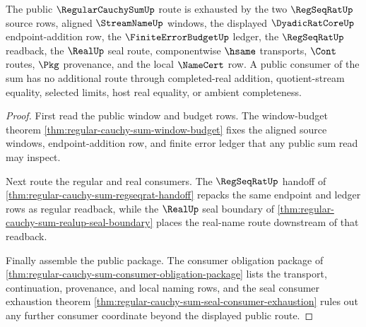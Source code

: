 \begin{theorem}
\label{thm:regular-cauchy-sum-bridged-public-route}
The public $\RegularCauchySumUp$ route is exhausted by the two $\RegSeqRatUp$ source rows, aligned $\StreamNameUp$ windows, the displayed $\DyadicRatCoreUp$ endpoint-addition row, the $\FiniteErrorBudgetUp$ ledger, the $\RegSeqRatUp$ readback, the $\RealUp$ seal route, componentwise $\hsame$ transports, $\Cont$ routes, $\Pkg$ provenance, and the local $\NameCert$ row. A public consumer of the sum has no additional route through completed-real addition, quotient-stream equality, selected limits, host real equality, or ambient completeness.
\end{theorem}
\begin{proof}
First read the public window and budget rows. The window-budget theorem \autoref{thm:regular-cauchy-sum-window-budget} fixes the aligned source windows, endpoint-addition row, and finite error ledger that any public sum read may inspect.

Next route the regular and real consumers. The $\RegSeqRatUp$ handoff of \autoref{thm:regular-cauchy-sum-regseqrat-handoff} repacks the same endpoint and ledger rows as regular readback, while the $\RealUp$ seal boundary of \autoref{thm:regular-cauchy-sum-realup-seal-boundary} places the real-name route downstream of that readback.

Finally assemble the public package. The consumer obligation package of \autoref{thm:regular-cauchy-sum-consumer-obligation-package} lists the transport, continuation, provenance, and local naming rows, and the seal consumer exhaustion theorem \autoref{thm:regular-cauchy-sum-seal-consumer-exhaustion} rules out any further consumer coordinate beyond the displayed public route.
\end{proof}

